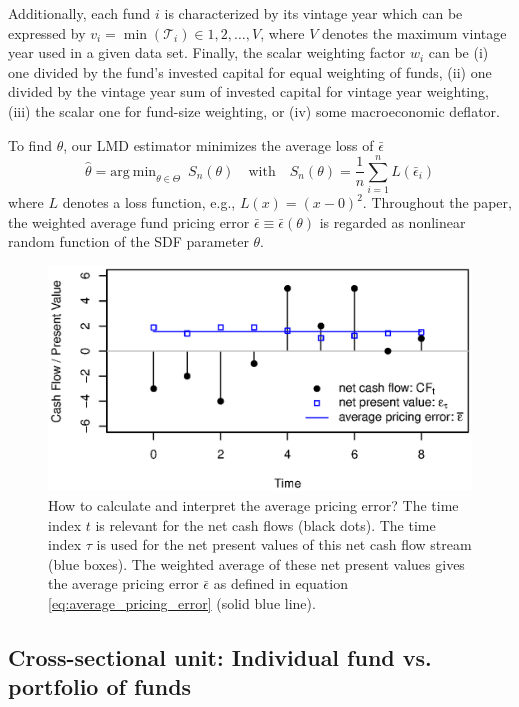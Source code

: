 \documentclass[12pt]{article}
\begin{document}
Additionally, each fund $i$ is characterized by its vintage year which can be expressed by $v_{i}=\min(\mathcal{T}_i) \in 1,2,\dots,V$, where $V$ denotes the maximum vintage year used in a given data set.
Finally, the scalar weighting factor $w_i$ can be (i) one divided by the fund's invested capital for equal weighting of funds, (ii) one divided by the vintage year sum of invested capital for vintage year weighting, (iii) the scalar one for fund-size weighting, or (iv) some macroeconomic deflator.

To find $\theta$, our LMD estimator \citep{PP97} minimizes the average loss of $\bar{\epsilon}$
\begin{equation}
\label{eq:estimator}
\hat{\theta} = 
\mathrm{arg \ min}_{\theta \in \Theta}
\enspace
S_n(\theta)
\quad
\mathrm{with}
\quad
S_n(\theta) = 
\frac{1}{n}
\sum_{i=1}^n
L \left( \bar{\epsilon}_{i} \right) 
\end{equation}
where $L$ denotes a loss function, e.g., $L(x)=(x-0)^2$.
Throughout the paper, the weighted average fund pricing error $\bar{\epsilon} \equiv \bar{\epsilon}(\theta)$ is regarded as nonlinear random function of the SDF parameter $\theta$.

\begin{figure}[ht]
	\centering
	\includegraphics{eps/npvs.eps}
	\caption{
		How to calculate and interpret the average pricing error?
		The time index $t$ is relevant for the net cash flows (black dots).
		The time index $\tau$ is used for the net present values of this net cash flow stream (blue boxes).
		The weighted average of these net present values gives the average pricing error $\bar{\epsilon}$ as defined in equation \ref{eq:average_pricing_error} (solid blue line).
	}
	\label{fig:npvs}
\end{figure}

\subsection{Cross-sectional unit: Individual fund vs. portfolio of funds}
\label{sec:cross_sectional_unit}
\end{document}
